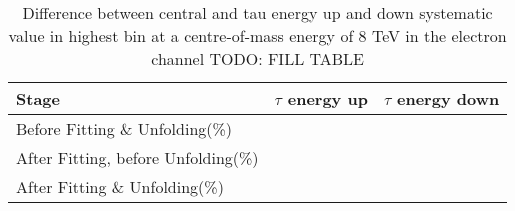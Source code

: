 \begin{table}[htbp]
\centering
\caption{Difference between central and tau energy up and down systematic value in highest \met bin at a
centre-of-mass energy of 8 TeV in the electron channel TODO: FILL TABLE} %
\label{tab:tau_up_down_final_bin_comparison}
\resizebox{\columnwidth}{!} {
\begin{tabular}{lrr}
\hline
Stage & $\tau$ energy up & $\tau$ energy down \\
\hline
Before Fitting \& Unfolding(\%) & & \\
After Fitting, before Unfolding(\%) & & \\
After Fitting \& Unfolding(\%) & & \\
\hline
\end{tabular}
}
\end{table}

